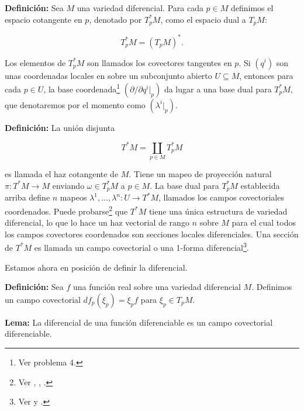 \documentclass[a4paper,10pt]{article}
\numberwithin{equation}{section}
\newcommand{\definicion}{\textbf{Definición: }}
\newcommand{\lema}{\textbf{Lema: }}
\begin{document}
\vspace{.3cm}

\definicion Sea $M$ una variedad diferencial. Para cada $p \in M$ definimos el 
espacio cotangente en $p$, denotado por $T_p^* M$, como el espacio dual a $T_p M$:

\begin{equation}
 T_p^* M = (T_p M)^*.
\end{equation}

Los elementos de $T_p^* M$ son llamados los covectores tangentes en $p$. Si $(q^i)$ 
son unas coordenadas locales en sobre un subconjunto abierto $U \subseteq M$, entonces 
para cada $p \in U$, la base coordenada\footnote{Ver problema 4.} $(\partial/\partial q^i|_p)$ 
da lugar a una base dual para $T_p^* M$, que denotaremos por el momento como 
$(\lambda^i|_p)$.

\vspace{.3cm}

\definicion La unión disjunta 

\begin{equation}
 T^*M =  \underset{p \in M}{\coprod} T^*_p M
\end{equation}

es llamada el haz cotangente de $M$. Tiene un mapeo de proyección natural 
$\pi: T^* M \rightarrow M$ enviando $\omega \in T^*_p M$ a $p \in M$. La base dual 
para $T^*_p M$ establecida arriba define $n$ mapeos $\lambda^1,\dots,\lambda^n: 
U \rightarrow T^*M$, llamados los campos covectoriales coordenados. Puede probarse\footnote{
Ver \cite{curtis}, \cite{lee}, \cite{kosinski}.} que $T^*M$ tiene una única 
estructura de variedad diferencial, lo que lo hace un haz vectorial de rango $n$ 
sobre $M$ para el cual todos los campos covectores coordenados son secciones 
locales diferenciales. Una sección de $T^* M$ es llamada un campo covectorial 
o una 1-forma diferencial\footnote{Ver \cite{lee} y \cite{torres}.}.

\vspace{.3cm}

Estamos ahora en posición de definir la diferencial.

\vspace{.3cm}

\definicion Sea $f$ una función real sobre una variedad diferencial $M$. Definimos 
un campo covectorial $df_p(\xi_p) = \xi_p f$ para $\xi_p \in T_p M$. 

\vspace{.3cm}

\lema La diferencial de una función diferenciable es un campo covectorial diferenciable.
\end{document}
